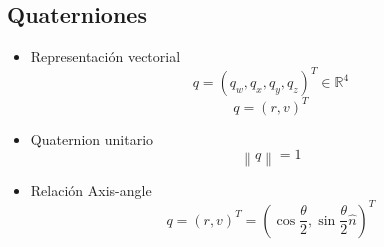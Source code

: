 \documentclass[main.tex]{subfiles}
\begin{document}
\subsection{Quaterniones}
\begin{itemize}
\item Representación vectorial
  \begin{equation}
    q=\left ( q_{w},q_{x},q_{y},q_{z} \right )^T \in \mathbb{R}^4
  \end{equation}
  \begin{equation}
    q=\left ( r,v \right )^T  
  \end{equation}
\item Quaternion unitario
  \begin{equation}
    \left \| q \right \|=1
  \end{equation}
\item Relación Axis-angle
  \begin{equation}
    q = \left( r,v \right) ^ T
      = \left(
          \cos\frac{\theta}{2},
          \sin\frac{\theta}{2} \hat{n}
        \right) ^ T
  \end{equation}
\end{itemize}
\end{document}
